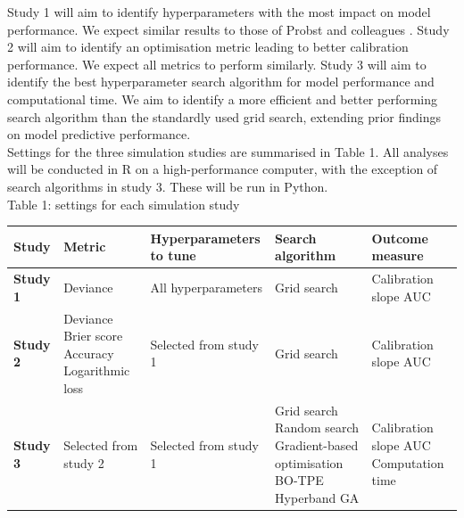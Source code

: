 \documentclass{article}
\begin{document}
Study 1 will aim to identify hyperparameters with the most impact on model performance. We expect similar results to those of Probst and colleagues \cite{probst_tunability_2019}. Study 2 will aim to identify an optimisation metric leading to better calibration performance. We expect all metrics to perform similarly. Study 3 will aim to identify the best hyperparameter search algorithm for model performance and computational time. We aim to identify a more efficient and better performing search algorithm than the standardly used grid search, extending prior findings \cite{yang_hyperparameter_2020} on model predictive performance.\\

Settings for the three simulation studies are summarised in Table 1. All analyses will be conducted in R on a high-performance computer, with the exception of search algorithms in study 3. These will be run in Python.\\

Table 1: settings for each simulation study\\
\begin{tabular}{>{\raggedright\arraybackslash}p{4cm}>{\raggedright\arraybackslash}p{2.5cm}>{\raggedright\arraybackslash}p{2.5cm}>{\raggedright\arraybackslash}p{3cm}>{\raggedright\arraybackslash}p{3cm}}
    \hline
    Study &
    Metric &
    Hyperparameters to tune &
    Search algorithm &
    Outcome measure\\
    \hline
    \textbf{Study 1} &
    Deviance &
    All hyperparameters &
    Grid search &
    Calibration slope \newline AUC\\
    \textbf{Study 2} &
    Deviance \newline Brier score \newline Accuracy \newline Logarithmic loss &
    Selected from study 1 &
    Grid search &
    Calibration slope \newline AUC\\
    \textbf{Study 3} &
    Selected from study 2 &
    Selected from study 1 &
    Grid search \newline Random search \newline Gradient-based optimisation \newline BO-TPE \newline Hyperband \newline GA &
    Calibration slope \newline AUC \newline Computation time\\
    \hline
\end{tabular}
\\
\end{document}
